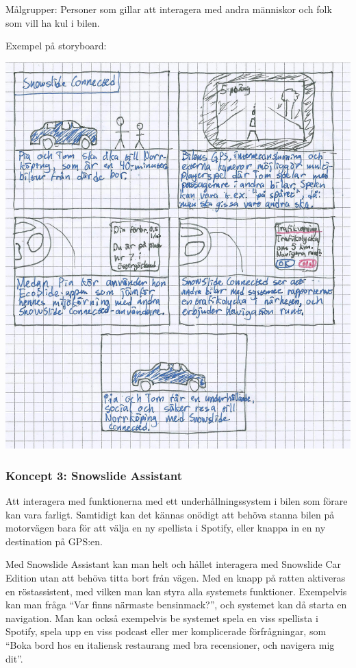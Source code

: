 \documentclass[a4paper,12pt,titlepage]{article}
\begin{document}
Målgrupper: Personer som gillar att interagera med andra människor och folk som
vill ha kul i bilen.

\newpage
Exempel på storyboard:

\begin{center}
\includegraphics[width=15cm]{images/connected.jpg}
\end{center}

\newpage
\subsubsection*{Koncept 3: Snowslide Assistant}

Att interagera med funktionerna med ett underhållningssystem i bilen som förare
kan vara farligt. Samtidigt kan det kännas onödigt att behöva stanna bilen på
motorvägen bara för att välja en ny spellista i Spotify, eller knappa in en ny
destination på GPS:en.

Med Snowslide Assistant kan man helt och hållet interagera med Snowslide Car
Edition utan att behöva titta bort från vägen. Med en knapp på ratten aktiveras
en röstassistent, med vilken man kan styra alla systemets funktioner.
Exempelvis kan man fråga ``Var finns närmaste bensinmack?'', och systemet kan då
starta en navigation. Man kan också exempelvis be systemet spela en viss spellista i Spotify,
spela upp en viss podcast eller mer komplicerade förfrågningar, som ``Boka bord
hos en italiensk restaurang med bra recensioner, och navigera mig dit''.
\end{document}
